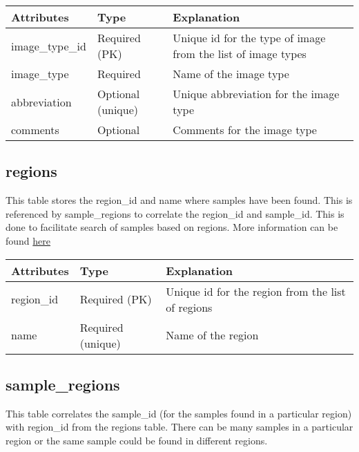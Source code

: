 \documentclass[letterpaper,10pt,english]{sphinxmanual}
\begin{document}
\begin{tabulary}{\linewidth}{|L|L|L|}
\hline
\textbf{
Attributes
} & \textbf{
Type
} & \textbf{
Explanation
}\\\hline

image\_type\_id
 & 
Required (PK)
 & 
Unique id for the type of image from the list of image types
\\\hline

image\_type
 & 
Required
 & 
Name of the image type
\\\hline

abbreviation
 & 
Optional (unique)
 & 
Unique abbreviation for the image type
\\\hline

comments
 & 
Optional
 & 
Comments for the image type
\\\hline
\end{tabulary}



\subsection{regions}
\label{Table_Description:regions}
This table stores the region\_id and name where samples have been found. This is referenced by sample\_regions to correlate the region\_id and sample\_id. This is done to facilitate search of samples based on regions. More information can be found
\href{http://wiki.cs.rpi.edu/trac/metpetdb/wiki/Region}{here}

\begin{tabulary}{\linewidth}{|L|L|L|}
\hline
\textbf{
Attributes
} & \textbf{
Type
} & \textbf{
Explanation
}\\\hline

region\_id
 & 
Required (PK)
 & 
Unique id for the region from the list of regions
\\\hline

name
 & 
Required (unique)
 & 
Name of the region
\\\hline
\end{tabulary}



\subsection{sample\_regions}
\label{Table_Description:sample-regions}
This table correlates the sample\_id (for the samples found in a particular region) with region\_id from the regions table. There can be many samples in a particular region or the same sample could be found in different regions.
\end{document}
